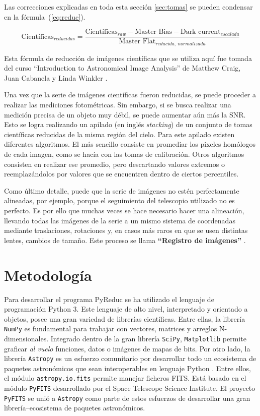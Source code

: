 \documentclass[a4paper, 12pt]{article}
\begin{document}
Las correcciones explicadas en toda esta sección \ref{sec:tomas} se pueden condensar en la fórmula~(\ref{eq:reduc}).


\begin{equation}
  \mbox{Científicas}_{reducidas} = \frac{\mbox{Científicas}_{raw} - \mbox{Master~Bias}-\mbox{Dark~current}_{escalada}}{\mbox{Master~Flat}_{reducida,~normalizada}}
  \label{eq:reduc}
\end{equation}

 Esta fórmula de reducción de imágenes científicas que se utiliza aquí fue tomada del curso
 ``Introduction to Astronomical Image Analysis'' de  Matthew Craig, Juan Cabanela y Linda Winkler \cite{craig}.

Una vez que la serie de imágenes científicas fueron reducidas, se puede proceder a realizar las mediciones fotométricas. Sin embargo, si se busca realizar una medición precisa de un objeto muy débil, se puede aumentar aún más la SNR. Esto se logra realizando un apilado (en inglés \textit{stacking}) de un conjunto de tomas científicas reducidas de la misma región del cielo. Para este apilado existen diferentes algoritmos. El más sencillo consiste en promediar los pixeles homólogos de cada imagen, como se hacía con las tomas de calibración. Otros algoritmos consisten en realizar ese promedio, pero descartando valores extremos o reemplazándolos por valores que  se encuentren dentro de ciertos percentiles.

Como último detalle, puede que la serie de imágenes no estén perfectamente alineadas, por ejemplo, porque el seguimiento del telescopio utilizado no es perfecto. Es por ello que muchas veces se hace necesario hacer una alineación, llevando todas las imágenes de la serie a un mismo sistema de coordenadas mediante traslaciones, rotaciones y, en casos más raros en que se usen distintas lentes, cambios de tamaño. Este proceso se llama {\bf ``Registro de imágenes''} \cite{brown}.

\section{Metodología}
Para desarrollar el programa PyReduc se ha utilizado el lenguaje de programación Python 3. Este lenguaje de alto nivel, interpretado y orientado a objetos, posee una gran variedad de librerías científicas. Entre ellas, la librería \texttt{NumPy} es fundamental para trabajar con vectores, matrices y arreglos N-dimensionales. Integrado dentro de la gran librería \texttt{SciPy}, \texttt{Matplotlib} permite graficar \textit{al vuelo} funciones, datos o imágenes de mapas de bits. Por otro lado, la librería \texttt{Astropy} es un esfuerzo comunitario por desarrollar todo un ecosistema de paquetes astronómicos que sean interoperables en lenguaje Python \cite{astropy}. Entre ellos, el módulo \texttt{astropy.io.fits} permite manejar ficheros FITS. Está basado en el módulo \texttt{PyFITS} desarrollado por el Space Telescope Science Institute. El proyecto \texttt{PyFITS} se unió a \texttt{Astropy} como parte de estos esfuerzos de desarrollar una gran librería--ecosistema de paquetes astronómicos.
\end{document}
